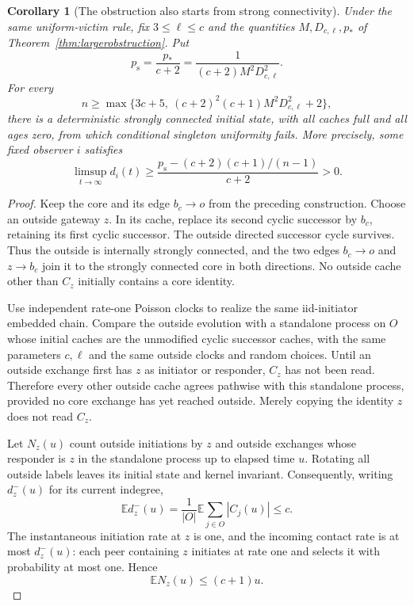 \documentclass[11pt]{article}
\newtheorem{corollary}[theorem]{Corollary}
\begin{document}
\begin{corollary}[The obstruction also starts from strong connectivity]
\label{cor:strongobstruction}
Under the same uniform-victim rule, fix $3\le\ell\le c$ and
the quantities $M,D_{c,\ell},p_*$ of
Theorem~\ref{thm:largerobstruction}. Put
\[
 p_{\mathrm s}=\frac{p_*}{c+2}
 =\frac{1}{(c+2)M^2D_{c,\ell}^2}.
\]
For every
\[
 n\ge\max\{3c+5,\ (c+2)^2(c+1)M^2D_{c,\ell}^2+2\},
\]
there is a deterministic \emph{strongly connected} initial
state, with all caches full and all ages zero, from which
conditional singleton uniformity fails. More precisely, some
fixed observer $i$ satisfies
\[
 \limsup_{t\to\infty}d_i(t)
 \ge\frac{p_{\mathrm s}-(c+2)(c+1)/(n-1)}{c+2}>0.
\]
\end{corollary}
\begin{proof}
Keep the core and its edge $b_c\to o$ from the preceding
construction. Choose an outside gateway $z$. In its cache,
replace its second cyclic successor by $b_c$, retaining its
first cyclic successor. The outside directed successor cycle
survives. Thus the outside is internally strongly connected,
and the two edges $b_c\to o$ and $z\to b_c$ join it to the
strongly connected core in both directions. No outside cache
other than $C_z$ initially contains a core identity.

Use independent rate-one Poisson clocks to realize the same
iid-initiator embedded chain. Compare the outside evolution
with a standalone process on $O$ whose initial caches are the
unmodified cyclic successor caches, with the same parameters
$c,\ell$ and the same outside clocks and random choices.
Until an outside exchange first has $z$ as initiator or
responder, $C_z$ has not been read. Therefore every other
outside cache agrees pathwise with this standalone process,
provided no core exchange has yet reached outside.
Merely copying the identity $z$ does not read $C_z$.

Let $N_z(u)$ count outside initiations by $z$ and outside
exchanges whose responder is $z$ in the standalone process
up to elapsed time $u$. Rotating all outside labels leaves
its initial state and kernel invariant. Consequently, writing
$d_z^-(u)$ for its current indegree,
\[
 \mathbb E d_z^-(u)
 =\frac1{|O|}\mathbb E\sum_{j\in O}|C_j(u)|\le c.
\]
The instantaneous initiation rate at $z$ is one, and the
incoming contact rate is at most $d_z^-(u)$: each peer
containing $z$ initiates at rate one and selects it with
probability at most one. Hence
\[
 \mathbb E N_z(u)\le(c+1)u.
\]


\end{proof}
\end{document}
